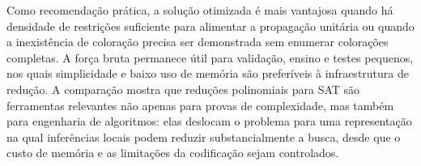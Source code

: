 Como recomendação prática, a solução otimizada é mais vantajosa quando há densidade de restrições suficiente para alimentar a propagação unitária ou quando a inexistência de coloração precisa ser demonstrada sem enumerar colorações completas. A força bruta permanece útil para validação, ensino e testes pequenos, nos quais simplicidade e baixo uso de memória são preferíveis à infraestrutura de redução. A comparação mostra que reduções polinomiais para SAT são ferramentas relevantes não apenas para provas de complexidade, mas também para engenharia de algoritmos: elas deslocam o problema para uma representação na qual inferências locais podem reduzir substancialmente a busca, desde que o custo de memória e as limitações da codificação sejam controlados.
